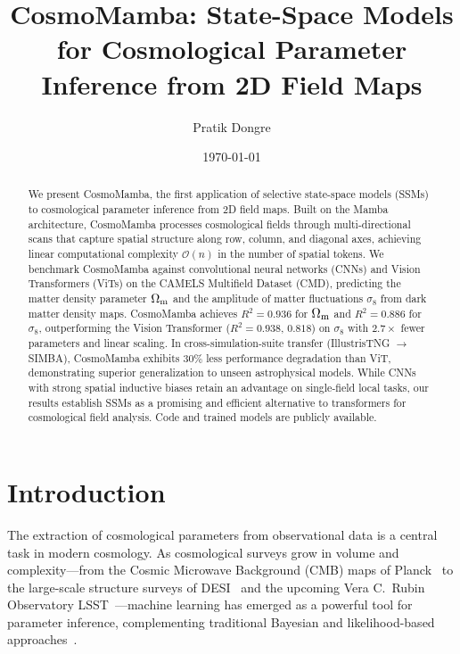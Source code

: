 \documentclass[twocolumn,showpacs,preprintnumbers,amsmath,amssymb,aps,prd]{revtex4-2}
\newcommand{\Om}{\Omega_{\rm m}}
\newcommand{\sig}{\sigma_8}
\newcommand{\Rsq}{R^2}
\begin{document}
\title{CosmoMamba: State-Space Models for Cosmological Parameter Inference from 2D Field Maps}

\author{Pratik Dongre}

\date{\today}

\begin{abstract}
We present CosmoMamba, the first application of selective state-space models (SSMs) to
cosmological parameter inference from 2D field maps. Built on the Mamba architecture,
CosmoMamba processes cosmological fields through multi-directional scans that capture
spatial structure along row, column, and diagonal axes, achieving linear computational
complexity $\mathcal{O}(n)$ in the number of spatial tokens. We benchmark CosmoMamba
against convolutional neural networks (CNNs) and Vision Transformers (ViTs) on the
CAMELS Multifield Dataset (CMD), predicting the matter density parameter $\Om$ and the
amplitude of matter fluctuations $\sig$ from dark matter density maps. CosmoMamba achieves
$\Rsq = 0.936$ for $\Om$ and $\Rsq = 0.886$ for $\sig$, outperforming the Vision
Transformer ($\Rsq = 0.938$, $0.818$) on $\sig$ with $2.7\times$ fewer parameters and
linear scaling. In cross-simulation-suite transfer (IllustrisTNG $\to$ SIMBA), CosmoMamba
exhibits $30\%$ less performance degradation than ViT, demonstrating superior
generalization to unseen astrophysical models. While CNNs with strong spatial inductive
biases retain an advantage on single-field local tasks, our results establish SSMs as a
promising and efficient alternative to transformers for cosmological field analysis. Code
and trained models are publicly available.
\end{abstract}

\maketitle

\section{Introduction}
\label{sec:intro}

The extraction of cosmological parameters from observational data is a central task in
modern cosmology. As cosmological surveys grow in volume and complexity---from the Cosmic
Microwave Background (CMB) maps of Planck~\cite{planck2020} to the large-scale structure
surveys of DESI~\cite{desi2024} and the upcoming Vera C.\ Rubin Observatory
LSST~\cite{lsst2019}---machine learning has emerged as a powerful tool for parameter
inference, complementing traditional Bayesian and likelihood-based
approaches~\cite{ntampaka2019,villaescusa2021}.
\end{document}
